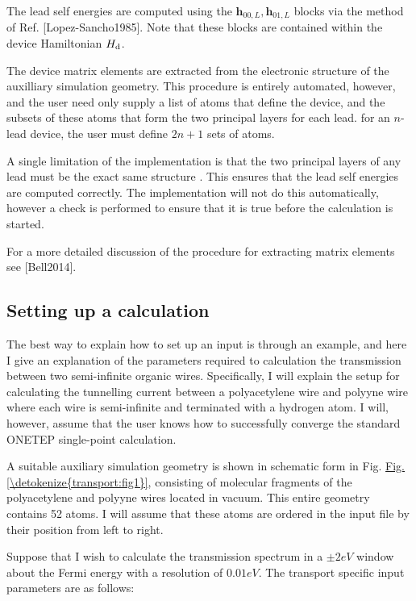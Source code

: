\documentclass[letterpaper,10pt,english]{sphinxmanual}
\begin{document}
The lead self energies are computed using the
\(\mathbf{h}_{00,L}, \mathbf{h}_{01,L}\) blocks via the method
of Ref. {[}Lopez-Sancho1985{]}. Note that these blocks are
contained within the device Hamiltonian \(H_{\rm d}\).

The device matrix elements are extracted from the electronic structure
of the auxilliary simulation geometry. This procedure is entirely
automated, however, and the user need only supply a list of atoms that
define the device, and the subsets of these atoms that form the two
principal layers for each lead.  for an \(n\)-lead device, the
user must define \(2n+1\) sets of atoms.

A single limitation of the implementation is that the two principal
layers of any lead must be the exact same structure . This ensures that the lead self energies are
computed correctly. The implementation will not do this automatically,
however a check is performed to ensure that it is true before the
calculation is started.

For a more detailed discussion of the procedure for extracting matrix
elements see {[}Bell2014{]}.


\subsection{Setting up a calculation}
\label{\detokenize{transport:setting-up-a-calculation}}
The best way to explain how to set up an input is through an example,
and here I give an explanation of the parameters required to calculation
the transmission between two semi-infinite organic wires. Specifically,
I will explain the setup for calculating the tunnelling current between
a polyacetylene wire and polyyne wire where each wire is semi-infinite
and terminated with a hydrogen atom. I will, however, assume that the
user knows how to successfully converge the standard ONETEP single-point
calculation.

A suitable auxiliary simulation geometry is shown in schematic form in Fig. \hyperref[\detokenize{transport:fig1}]{Fig.\@ \ref{\detokenize{transport:fig1}}},
consisting of molecular fragments of the polyacetylene and polyyne wires
located in vacuum. This entire geometry contains 52 atoms. I will assume
that these atoms are ordered in the input file by their position from
left to right.

Suppose that I wish to calculate the transmission spectrum in a
\(\pm 2eV\) window about the Fermi energy with a resolution
of \(0.01eV\). The transport specific input parameters are as
follows:
\end{document}
